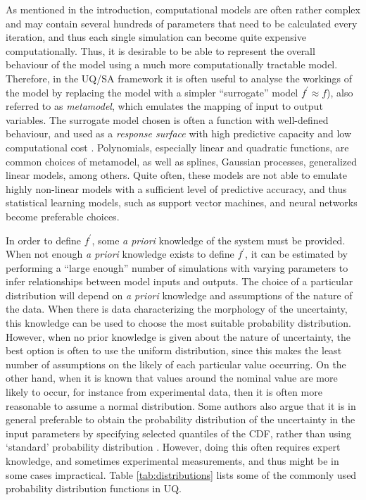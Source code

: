 \documentclass[12pt]{article}
\begin{document}
 \vspace{0.5cm}
 As mentioned in the introduction,  computational models are  often rather complex and may contain several hundreds of parameters that need to be calculated every iteration, and thus each single simulation can become quite  expensive computationally. Thus, it is desirable to be able to represent the overall behaviour of the model using a much more computationally tractable model. Therefore, in the UQ/SA framework it is often useful to analyse the workings of the model by replacing the model with a simpler ``surrogate'' model $f^{\prime} \approx f$), also referred to as \textit{metamodel}, which emulates the mapping of  input to output variables. The surrogate model chosen is often a function with well-defined behaviour, and used as a \textit{response surface} with high predictive capacity and low computational cost \cite{IOOSS20061241}. Polynomials, especially linear and quadratic functions, are common choices of metamodel, as well as splines, Gaussian processes, generalized linear models, among others. Quite often, these models are not able to emulate highly non-linear models with a sufficient level of predictive accuracy, and thus statistical learning models, such as support vector machines, and neural networks become preferable choices. 
 
 In order to define $f^{\prime}$, some \textit{a priori} knowledge of the system must be provided. When not enough \textit{a priori} knowledge exists to define $f^{\prime}$, it can be estimated by performing a ``large enough'' number of simulations with varying  parameters to infer relationships between model inputs and outputs. %
  The choice of a particular distribution will depend on \textit{a priori} knowledge and assumptions of the nature of the data.  When there is data characterizing the morphology of the uncertainty, this knowledge can be used to choose the most suitable probability distribution. However, when no prior knowledge is given about the nature of uncertainty, the best option is often to use the uniform distribution, since this makes the least number of assumptions on the likely of each particular value occurring. On the other hand, when it is known that values around the nominal value are more likely to occur, for instance from experimental data, then it is often more reasonable to assume a normal distribution. Some authors also argue that it is in general preferable to obtain the probability distribution of the uncertainty in the input parameters by specifying selected quantiles of the CDF, rather than using `standard' probability distribution \cite{HELTON20061175}. However, doing this often requires expert knowledge, and sometimes experimental measurements, and thus might be in some cases impractical.    Table \ref{tab:distributions} lists some of the commonly used probability distribution functions in UQ. 
  
\end{document}
